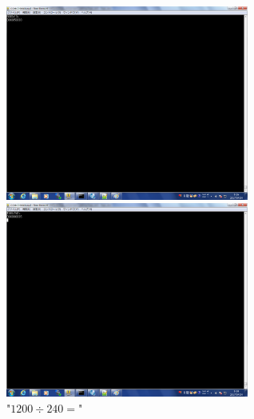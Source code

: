 \documentclass{jsarticle}
\begin{document}
\begin{figure}[htbp]
 \begin{minipage}{0.5\hsize}
  \begin{center}
  \includegraphics[width=8cm,bb=0 0 1280 1024]{5000mul10.png}
  \end{center}
  \caption{"$5000\times10=$"}
 \end{minipage}
 \begin{minipage}{0.5\hsize}
  \begin{center}
   \includegraphics[width=8cm,bb=0 0 1280 1024]{1200div240.png}
  \end{center}
  \caption{"$1200\div240=$"}
 \end{minipage}
\end{figure}
\end{document}
